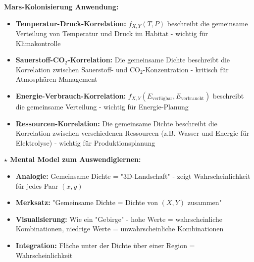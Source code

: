 \begin{denoobification}
\textbf{Mars-Kolonisierung Anwendung:}
\begin{itemize}
    \item \textbf{Temperatur-Druck-Korrelation:} $f_{X,Y}(T,P)$ beschreibt die gemeinsame Verteilung von Temperatur und Druck im Habitat - wichtig für Klimakontrolle
    \item \textbf{Sauerstoff-CO$_2$-Korrelation:} Die gemeinsame Dichte beschreibt die Korrelation zwischen Sauerstoff- und CO$_2$-Konzentration - kritisch für Atmosphären-Management
    \item \textbf{Energie-Verbrauch-Korrelation:} $f_{X,Y}(E_{\text{verfügbar}}, E_{\text{verbraucht}})$ beschreibt die gemeinsame Verteilung - wichtig für Energie-Planung
    \item \textbf{Ressourcen-Korrelation:} Die gemeinsame Dichte beschreibt die Korrelation zwischen verschiedenen Ressourcen (z.B. Wasser und Energie für Elektrolyse) - wichtig für Produktionsplanung
\end{itemize}

\textbf{$\star$ Mental Model zum Auswendiglernen:}
\begin{itemize}
    \item \textbf{Analogie:} Gemeinsame Dichte = "3D-Landschaft" - zeigt Wahrscheinlichkeit für jedes Paar $(x,y)$
    \item \textbf{Merksatz:} "Gemeinsame Dichte = Dichte von $(X,Y)$ zusammen"
    \item \textbf{Visualisierung:} Wie ein "Gebirge" - hohe Werte = wahrscheinliche Kombinationen, niedrige Werte = unwahrscheinliche Kombinationen
    \item \textbf{Integration:} Fläche unter der Dichte über einer Region = Wahrscheinlichkeit
\end{itemize}

\begin{center}
\end{center}
\end{denoobification}
